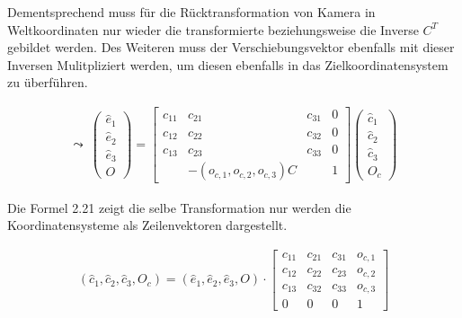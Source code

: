 Dementsprechend muss für die Rücktransformation von Kamera in Weltkoordinaten nur wieder die transformierte beziehungsweise die Inverse \ensuremath{C^T} gebildet werden. Des Weiteren muss der Verschiebungsvektor ebenfalls mit dieser Inversen Mulitpliziert werden, um diesen ebenfalls in das Zielkoordinatensystem zu überführen.
	
	
	\begin{gather}
	\leadsto \: \begin{pmatrix}
	\hat{e}_1\\
	\hat{e}_2\\
	\hat{e}_3\\
	O
	\end{pmatrix} = 
	\begin{bmatrix}
	c_{11} & c_{21} & c_{31} & 0\\
	c_{12} & c_{22} & c_{32} & 0\\
	c_{13} & c_{23} & c_{33} & 0\\
	&-(o_{c,1}, o_{c,2}, o_{c,3})C& & 1
	\end{bmatrix}
	\begin{pmatrix}
	\hat{c}_1\\
	\hat{c}_2\\
	\hat{c}_3\\
	O_c
	\end{pmatrix}
	\end{gather}
	
	
	
	
%	
	
	Die Formel 2.21 zeigt die selbe Transformation nur werden die Koordinatensysteme als Zeilenvektoren dargestellt.

	\begin{gather}
	(\hat{c}_1, \hat{c}_2, \hat{c}_3, O_c) = (\hat{e}_1,\hat{e}_2, \hat{e}_3, O) \cdot
	\begin{bmatrix} 
	c_{11} & c_{21} & c_{31} & o_{c,1}\\
	c_{12} & c_{22} & c_{23} & o_{c,2}\\
	c_{13} & c_{32} & c_{33} & o_{c,3}\\
	0           &       0       &   0         & 1   
	\end{bmatrix}
	\end{gather}	
	
